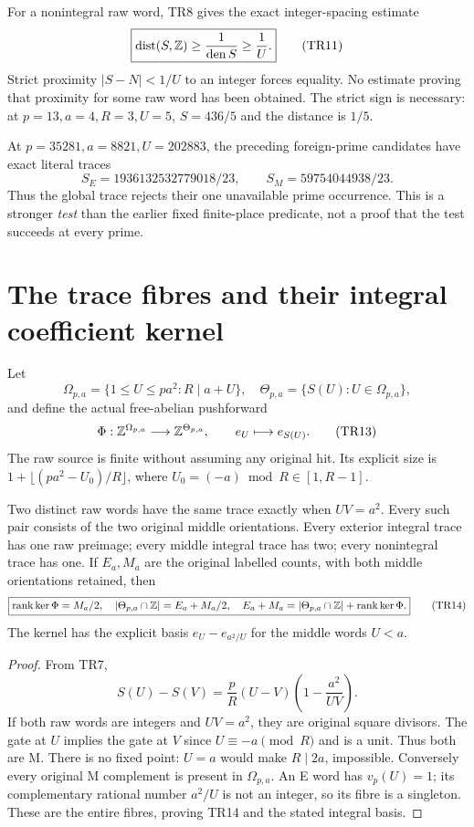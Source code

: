 For a nonintegral raw word, TR8 gives the exact integer-spacing estimate
\[
 \boxed{\operatorname{dist}(S,\mathbb Z)\ge\frac1{\operatorname{den} S}\ge\frac1U.}  \tag{TR11}
\]
Strict proximity $|S-N|<1/U$ to an integer forces equality. No estimate proving
that proximity for some raw word has been obtained. The strict sign is necessary:
at $p=13,a=4,R=3,U=5$, $S=436/5$ and the distance is $1/5$.

At $p=35281,a=8821,U=202883$, the preceding foreign-prime candidates have exact
literal traces
\[
 S_E=1936132532779018/23,\qquad S_M=59754044938/23.        \tag{TR12}
\]
Thus the global trace rejects their one unavailable prime occurrence. This is a
stronger \emph{test} than the earlier fixed finite-place predicate, not a proof
that the test succeeds at every prime.

\section{The trace fibres and their integral coefficient kernel}
Let
\[
 \Omega_{p,a}=\{1\le U\le pa^2:R\mid a+U\},
 \quad \Theta_{p,a}=\{S(U):U\in\Omega_{p,a}\},
\]
and define the actual free-abelian pushforward
\[
 \Phi:\mathbb Z^{\Omega_{p,a}}\longrightarrow\mathbb Z^{\Theta_{p,a}},
 \qquad e_U\longmapsto e_{S(U)}.                         \tag{TR13}
\]
The raw source is finite without assuming any original hit. Its explicit size is
$1+\lfloor(pa^2-U_0)/R\rfloor$, where $U_0=(-a)\bmod R\in[1,R-1]$.

\begin{theorem}\label{thm:fibre}
Two distinct raw words have the same trace exactly when $UV=a^2$. Every such
pair consists of the two original middle orientations. Every exterior integral
trace has one raw preimage; every middle integral trace has two; every
nonintegral trace has one. If $E_a,M_a$ are the original labelled counts, with
both middle orientations retained, then
\[
 \boxed{\operatorname{rank}\ker\Phi=M_a/2,\quad
 |\Theta_{p,a}\cap\mathbb Z|=E_a+M_a/2,\quad
 E_a+M_a=|\Theta_{p,a}\cap\mathbb Z|+\operatorname{rank}\ker\Phi.}            \tag{TR14}
\]
The kernel has the explicit basis $e_U-e_{a^2/U}$ for the middle words $U<a$.
\end{theorem}
\begin{proof}
From TR7,
\[
 S(U)-S(V)=\frac pR(U-V)\left(1-\frac{a^2}{UV}\right).  \tag{TR15}
\]
If both raw words are integers and $UV=a^2$, they are original square divisors.
The gate at $U$ implies the gate at $V$ since $U\equiv-a\pmod R$ and is a unit.
Thus both are M. There is no fixed point: $U=a$ would make $R\mid2a$, impossible.
Conversely every original M complement is present in $\Omega_{p,a}$. An E word
has $v_p(U)=1$; its complementary rational number $a^2/U$ is not an integer,
so its fibre is a singleton. These are the entire fibres, proving TR14 and
the stated integral basis.
\end{proof}

